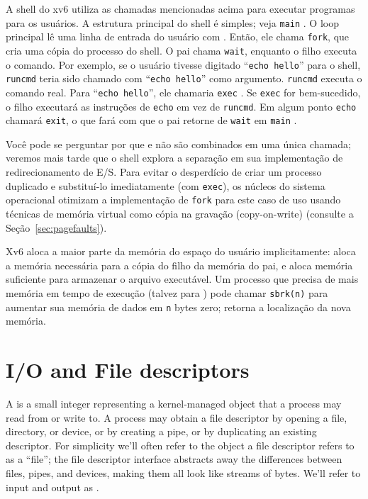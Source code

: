 A shell do xv6 utiliza as chamadas mencionadas acima para executar programas para
os usuários. A estrutura principal do shell é simples; veja
\lstinline{main}
.
O loop principal lê uma linha de entrada do usuário com
.
Então, ele chama
\lstinline{fork},
que cria uma cópia do processo do shell. O
pai chama
\lstinline{wait},
enquanto o filho executa o comando.  Por exemplo, se o usuário
tivesse digitado
``\lstinline{echo hello}''
para o shell,
\lstinline{runcmd}
teria sido chamado com
``\lstinline{echo hello}''
como argumento.
\lstinline{runcmd}
executa o comando real. Para
``\lstinline{echo hello}'',
ele chamaria
\lstinline{exec}
.
Se
\lstinline{exec}
for bem-sucedido, o filho executará as instruções de
\lstinline{echo}
em vez de
\lstinline{runcmd}.  Em algum ponto
\lstinline{echo}
chamará
\lstinline{exit},
o que fará com que o pai retorne de
\lstinline{wait}
em
\lstinline{main}
.


Você pode se perguntar por que
e
não são combinados em uma única chamada; veremos mais tarde que
o shell explora a separação em sua implementação de
redirecionamento de E/S.
Para evitar o desperdício de
criar um processo duplicado e substituí-lo imediatamente (com \lstinline{exec}),
os núcleos do sistema operacional otimizam a implementação de
\lstinline{fork}
para este caso de uso usando técnicas de memória virtual como
cópia na gravação (copy-on-write) (consulte a Seção~\ref{sec:pagefaults}).

Xv6 aloca a maior parte da memória do espaço do usuário
implicitamente:
aloca a memória necessária para a cópia do filho da
memória do pai, e
aloca memória suficiente para armazenar o arquivo executável.
Um processo que precisa de mais memória em tempo de execução (talvez para
)
pode chamar
\lstinline{sbrk(n)}
para aumentar sua memória de dados em
\lstinline{n} bytes zero;
retorna a localização da nova memória.

\section{I/O and File descriptors}

A 
is a small integer representing a kernel-managed object
that a process may read from or write to.
A process may obtain a file descriptor by opening a file, directory,
or device, or by creating a pipe, or by duplicating an existing
descriptor.
For simplicity we'll often refer to the object a file descriptor
refers to as a ``file'';
the file descriptor interface abstracts away the differences between
files, pipes, and devices, making them all look like streams of bytes.
We'll refer to input and output as .

